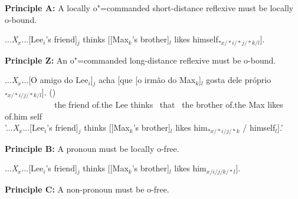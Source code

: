 \documentclass[output=paper
	        ,collection
	        ,collectionchapter
 	        ,biblatex
                ,babelshorthands
                ,newtxmath
                ,draftmode
                ,colorlinks, citecolor=brown
]{langscibook}
\begin{document}
%
	

\begin{exe}
\ex
\label{PrincipleA}
{\textbf{Principle A:}} A locally o"=commanded short-distance
reflexive must be \mbox{locally} o-bound.

\sn
{...{\em X}$_{x}$...[Lee$_{i}$'s friend]$_{j}$ thinks
[[Max$_{k}$'s brother]$_{l}$ likes %
himself$_{*x/*i/*j/*k/l}$].}
\end{exe}


\begin{exe}
\ex
\label{PrincipleZ}
{\textbf{Principle Z:}} An o"=commanded long-distance reflexive must be
o-bound.

\sn
\gll ...{\em X}$_{x}$...[O amigo do Lee$_{i}$]$_{j}$ acha [que [o
irm\~{a}o do Max$_{k}$]$_{l}$ gosta dele pr\'{o}prio$_{*x/*i/j/*k/l}$]. ()\\ \mbox{ }\mbox{ }\mbox{ }\mbox{ }\mbox{ }\mbox{ }\mbox{ }\mbox{ }\mbox{ }\mbox{ }\mbox{ }\mbox{ }the friend of.the Lee thinks \mbox{ }that \mbox{ }the brother of.the Max likes of.him self\\
\trans '...{\em X}$_{x}$...[Lee$_{i}$'s friend]$_{j}$ thinks [[Max$_{k}$'s brother]$_{l}$
likes him$_{*x/*i/j/*k}$ / \linebreak
himself$_{l}$].'
\end{exe}



\begin{exe}
\ex
\label{PrincipleB}
{\textbf{Principle B:}} A pronoun must be locally o-free.


\sn
{...{\em X}$_{x}$...[Lee$_{i}$'s friend]$_{j}$ thinks [[Max$_{k}$'s brother]$_{l}$
likes %
 him$_{x/i/j/k/*l}$].}
\end{exe}



\begin{exe}
\ex
\label{PrincipleC}
{\textbf{Principle C:}} A non-pronoun must be o-free.

\end{exe}
\vspace{4 mm}
\end{document}
